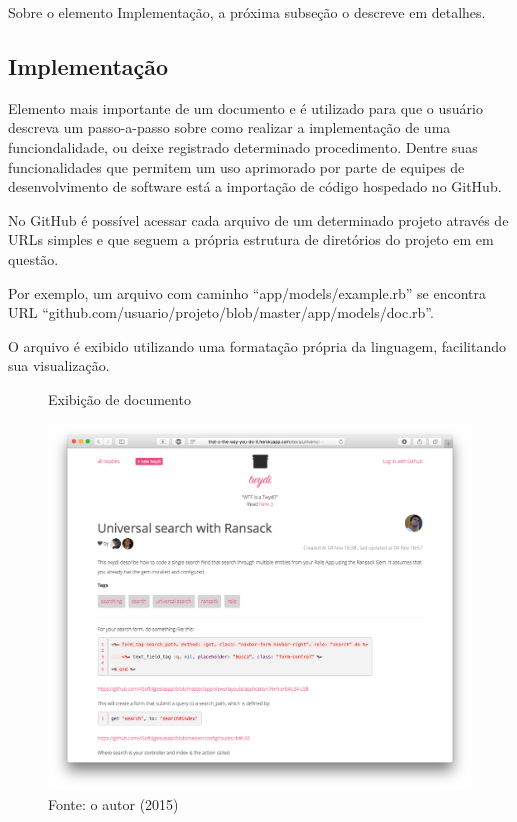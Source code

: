 Sobre o elemento Implementação, a próxima subseção o descreve em detalhes.

\subsection{Implementação}

Elemento mais importante de um documento e é utilizado para que o usuário descreva um passo-a-passo sobre
como realizar a implementação de uma funciondalidade, ou deixe registrado determinado procedimento. Dentre suas funcionalidades que permitem um uso aprimorado por parte de equipes de desenvolvimento de software está a importação de código hospedado no GitHub.

No GitHub é possível acessar cada arquivo de um determinado projeto através de URLs simples e que seguem a própria estrutura de diretórios do projeto em em questão.

Por exemplo, um arquivo com caminho ``app/models/example.rb'' se encontra URL ``github.com/usuario/projeto/blob/master/app/models/doc.rb''.

O arquivo é exibido utilizando uma formatação própria da linguagem, facilitando sua visualização.

\begin{figure}[h]
	\centering
    \caption{Exibição de documento}
    \includegraphics[width=15cm]{Imagens/print-implementation-1.png}
	\caption*{Fonte: o autor (2015)}
\end{figure}

